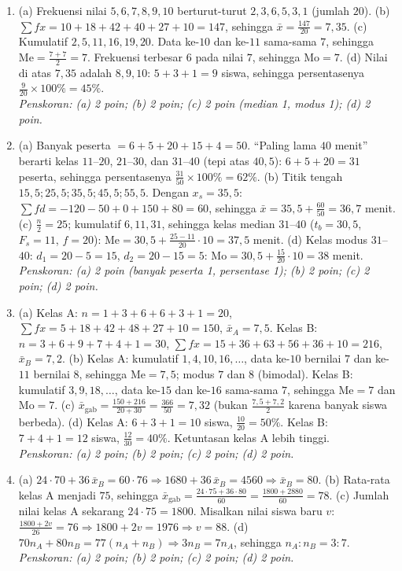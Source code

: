 \documentclass[a4paper,11pt]{article}
\newcommand{\dis}{\displaystyle}
\newcommand{\Me}{\mathrm{Me}}
\newcommand{\Mo}{\mathrm{Mo}}
\begin{document}
\small\begin{enumerate}[leftmargin=2em,itemsep=3pt,topsep=2pt]
\item[\textbf{1.}] (a) Frekuensi nilai $5,6,7,8,9,10$ berturut-turut $2,3,6,5,3,1$ (jumlah $20$). (b) $\sum fx=10+18+42+40+27+10=147$, sehingga $\bar{x}=\dis\frac{147}{20}=7{,}35$. (c) Kumulatif $2,5,11,16,19,20$. Data ke-$10$ dan ke-$11$ sama-sama $7$, sehingga $\Me=\dis\frac{7+7}{2}=7$. Frekuensi terbesar $6$ pada nilai $7$, sehingga $\Mo=7$. (d) Nilai di atas $7{,}35$ adalah $8,9,10$: $5+3+1=9$ siswa, sehingga persentasenya $\dis\frac{9}{20}\times100\%=45\%$. \\ \textit{Penskoran: (a) 2 poin; (b) 2 poin; (c) 2 poin (median 1, modus 1); (d) 2 poin.}
\item[\textbf{2.}] (a) Banyak peserta $=6+5+20+15+4=50$. ``Paling lama $40$ menit'' berarti kelas $11$--$20$, $21$--$30$, dan $31$--$40$ (tepi atas $40{,}5$): $6+5+20=31$ peserta, sehingga persentasenya $\dis\frac{31}{50}\times100\%=62\%$. (b) Titik tengah $15{,}5;25{,}5;35{,}5;45{,}5;55{,}5$. Dengan $x_s=35{,}5$: $\sum fd=-120-50+0+150+80=60$, sehingga $\bar{x}=35{,}5+\dis\frac{60}{50}=36{,}7$ menit. (c) $\dis\frac n2=25$; kumulatif $6,11,31$, sehingga kelas median $31$--$40$ ($t_b=30{,}5$, $F_s=11$, $f=20$): $\Me=30{,}5+\dis\frac{25-11}{20}\cdot10=37{,}5$ menit. (d) Kelas modus $31$--$40$: $d_1=20-5=15$, $d_2=20-15=5$: $\Mo=30{,}5+\dis\frac{15}{20}\cdot10=38$ menit. \\ \textit{Penskoran: (a) 2 poin (banyak peserta 1, persentase 1); (b) 2 poin; (c) 2 poin; (d) 2 poin.}
\item[\textbf{3.}] (a) Kelas A: $n=1+3+6+6+3+1=20$, $\sum fx=5+18+42+48+27+10=150$, $\bar{x}_A=7{,}5$. Kelas B: $n=3+6+9+7+4+1=30$, $\sum fx=15+36+63+56+36+10=216$, $\bar{x}_B=7{,}2$. (b) Kelas A: kumulatif $1,4,10,16,\dots$, data ke-$10$ bernilai $7$ dan ke-$11$ bernilai $8$, sehingga $\Me=7{,}5$; modus $7$ dan $8$ (bimodal). Kelas B: kumulatif $3,9,18,\dots$, data ke-$15$ dan ke-$16$ sama-sama $7$, sehingga $\Me=7$ dan $\Mo=7$. (c) $\bar{x}_{\text{gab}}=\dis\frac{150+216}{20+30}=\dis\frac{366}{50}=7{,}32$ (bukan $\frac{7{,}5+7{,}2}{2}$ karena banyak siswa berbeda). (d) Kelas A: $6+3+1=10$ siswa, $\dis\frac{10}{20}=50\%$. Kelas B: $7+4+1=12$ siswa, $\dis\frac{12}{30}=40\%$. Ketuntasan kelas A lebih tinggi. \\ \textit{Penskoran: (a) 2 poin; (b) 2 poin; (c) 2 poin; (d) 2 poin.}
\item[\textbf{4.}] (a) $24\cdot70+36\,\bar{x}_B=60\cdot76\Rightarrow1680+36\,\bar{x}_B=4560\Rightarrow\bar{x}_B=80$. (b) Rata-rata kelas A menjadi $75$, sehingga $\bar{x}_{\text{gab}}=\dis\frac{24\cdot75+36\cdot80}{60}=\dis\frac{1800+2880}{60}=78$. (c) Jumlah nilai kelas A sekarang $24\cdot75=1800$. Misalkan nilai siswa baru $v$: $\dis\frac{1800+2v}{26}=76\Rightarrow1800+2v=1976\Rightarrow v=88$. (d) $70n_A+80n_B=77(n_A+n_B)\Rightarrow3n_B=7n_A$, sehingga $n_A:n_B=3:7$. \\ \textit{Penskoran: (a) 2 poin; (b) 2 poin; (c) 2 poin; (d) 2 poin.}

\end{enumerate}
\end{document}
